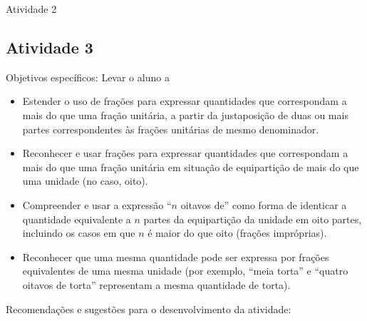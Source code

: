 \documentclass[oneside]{book}
\begin{document}
\begin{multicols}{2}
\begin{resposta*}{Atividade 2}
\end{resposta*}




\subsection{Atividade 3}




  Objetivos específicos: Levar o aluno a
\begin{itemize} %
    \item       Estender o uso de frações para expressar quantidades que correspondam a mais do que uma fração unitária, a partir da justaposição de duas ou mais partes correspondentes às frações unitárias de mesmo denominador.
    \item       Reconhecer e usar frações para expressar quantidades que correspondam a mais do que uma fração unitária em situação de equipartição de mais do que uma unidade (no caso, oito).
    \item       Compreender e usar a expressão       ``$n$ oitavos de''       como forma de identicar a quantidade equivalente a       $n$       partes da equipartição da unidade em oito partes, incluindo os casos em que       $n$       é maior do que oito (frações impróprias).
    \item       Reconhecer que uma mesma quantidade pode ser expressa por frações equivalentes de uma mesma unidade (por exemplo,       ``meia torta''       e       ``quatro oitavos de torta''       representam a mesma quantidade de torta).
\end{itemize} %


  Recomendações e sugestões para o desenvolvimento da atividade:


\end{multicols}
\end{document}
